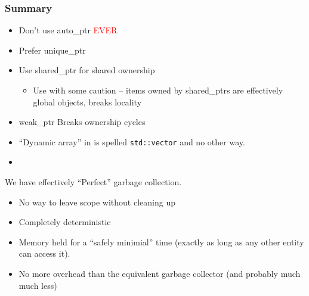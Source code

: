 
\begin{frame}[fragile,t]
\frametitle{Summary}

\begin{itemize}
\item Don't use auto\_ptr \textcolor{red}{EVER}
\pause{}
\item Prefer unique\_ptr
\pause{}
\item Use shared\_ptr for shared ownership
\begin{itemize}
  \item Use with some caution -- items owned by shared\_ptrs are
    effectively global objects, breaks locality
\end{itemize}
\pause{}
\item weak\_ptr Breaks ownership cycles
\pause{}
\item ``Dynamic array'' in \CC is spelled \texttt{std::vector} \Emph
  {and no other way}.
\item {}
\end{itemize}
\vskip 12pt
\pause{}

We have effectively ``Perfect'' garbage collection.
\begin{itemize}
\item No way to leave scope without cleaning up
\item Completely deterministic
\item Memory held for a ``safely minimial'' time (exactly as long as
  any other entity can access it).
\item No more overhead than the equivalent garbage collector (and
  probably much much less)
\end{itemize}

\end{frame}















